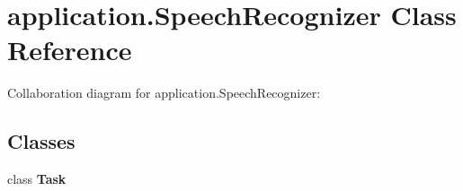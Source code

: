 \hypertarget{classapplication_1_1_speech_recognizer}{}\section{application.\+Speech\+Recognizer Class Reference}
\label{classapplication_1_1_speech_recognizer}


Collaboration diagram for application.\+Speech\+Recognizer\+:
\subsection*{Classes}
\begin{DoxyCompactItemize}
\item 
class {\bfseries Task}
\end{DoxyCompactItemize}
